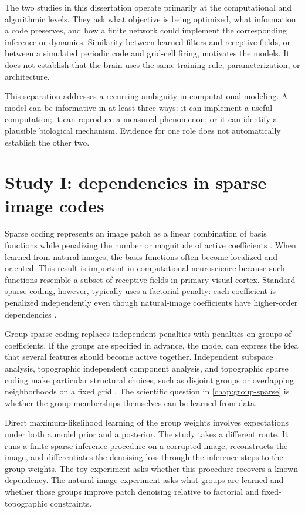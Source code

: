The two studies in this dissertation operate primarily at the computational and algorithmic levels. They ask what objective is being optimized, what information a code preserves, and how a finite network could implement the corresponding inference or dynamics. Similarity between learned filters and receptive fields, or between a simulated periodic code and grid-cell firing, motivates the models. It does not establish that the brain uses the same training rule, parameterization, or architecture.

This separation addresses a recurring ambiguity in computational modeling. A model can be informative in at least three ways: it can implement a useful computation; it can reproduce a measured phenomenon; or it can identify a plausible biological mechanism. Evidence for one role does not automatically establish the other two.

\section{Study I: dependencies in sparse image codes}
\label{sec:intro-sparse}

Sparse coding represents an image patch as a linear combination of basis functions while penalizing the number or magnitude of active coefficients \citep{ob96,ob97}. When learned from natural images, the basis functions often become localized and oriented. This result is important in computational neuroscience because such functions resemble a subset of receptive fields in primary visual cortex. Standard sparse coding, however, typically uses a factorial penalty: each coefficient is penalized independently even though natural-image coefficients have higher-order dependencies \citep{zc99,se01,ky09}.

Group sparse coding replaces independent penalties with penalties on groups of coefficients. If the groups are specified in advance, the model can express the idea that several features should become active together. Independent subspace analysis, topographic independent component analysis, and topographic sparse coding make particular structural choices, such as disjoint groups or overlapping neighborhoods on a fixed grid \citep{ha00,ha01ica,ha01sc}. The scientific question in \cref{chap:group-sparse} is whether the group memberships themselves can be learned from data.

Direct maximum-likelihood learning of the group weights involves expectations under both a model prior and a posterior. The study takes a different route. It runs a finite sparse-inference procedure on a corrupted image, reconstructs the image, and differentiates the denoising loss through the inference steps to the group weights. The toy experiment asks whether this procedure recovers a known dependency. The natural-image experiment asks what groups are learned and whether those groups improve patch denoising relative to factorial and fixed-topographic constraints.

